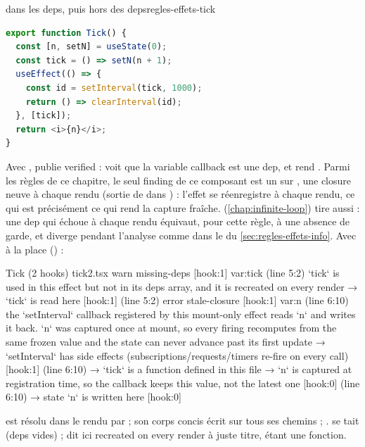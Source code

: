 \begin{exemple}{ dans les deps, puis hors des deps}{regles-effets-tick}
\begin{lstlisting}[language=TypeScript]
export function Tick() {
  const [n, setN] = useState(0);
  const tick = () => setN(n + 1);
  useEffect(() => {
    const id = setInterval(tick, 1000);
    return () => clearInterval(id);
  }, [tick]);
  return <i>{n}</i>;
}
\end{lstlisting}
Avec \code{[tick]},  publie \og verified\fg{} :  voit que la variable callback est une dep, et rend . Parmi les règles de ce chapitre, le seul finding de ce composant est un \Warning{}  sur , une closure neuve à chaque rendu (sortie de  dans ) : l'effet se réenregistre à chaque rendu, ce qui est précisément ce qui rend la capture fraîche.  (\cref{chap:infinite-loop}) tire aussi : une dep qui échoue à chaque rendu équivaut, pour cette règle, à une absence de garde, et  diverge pendant l'analyse comme dans le  du \cref{sec:regles-effets-info}. Avec \code{[]} à la place () :
\begin{sortie}
  Tick  (2 hooks)  tick2.tsx
    warn   missing-deps  [hook:1]  var:tick  (line 5:2)  `tick` is used in this effect but not in its deps array, and it is recreated on every render
       → `tick` is read here [hook:1] (line 5:2)
    error  stale-closure  [hook:1]  var:n  (line 6:10)  the `setInterval` callback registered by this mount-only effect reads `n` and writes it back. `n` was captured once at mount, so every firing recomputes from the same frozen value and the state can never advance past its first update
       → `setInterval` has side effects (subscriptions/requests/timers re-fire on every call) [hook:1] (line 6:10)
       → `tick` is a function defined in this file
       → `n` is captured at registration time, so the callback keeps this value, not the latest one [hook:0] (line 6:10)
       → state `n` is written here [hook:0]
\end{sortie}
 est résolu dans le rendu par  ; son corps concis écrit  sur tous ses chemins ; \Error.  se tait (deps vides) ;  dit ici \og recreated on every render\fg{} à juste titre,  étant une fonction.
\end{exemple}

